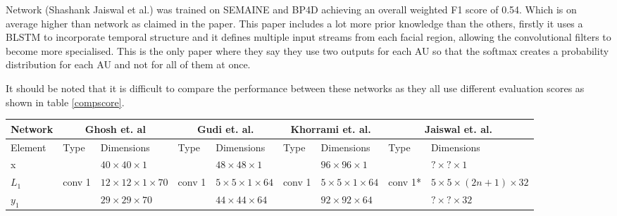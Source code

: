 Network \cite{Jaiswal2016} (Shashank Jaiswal et al.) was trained on SEMAINE and
BP4D achieving an overall weighted F1 score of 0.54. Which is on average higher
than network \cite{Gudi2015} as claimed in the paper. This paper includes a lot more
prior knowledge than the others, firstly it uses a BLSTM to incorporate temporal structure
and it defines multiple input streams from each facial region, allowing the convolutional
filters to become more specialised. This is the only paper where they say they use
two outputs for each AU so that the softmax creates a probability distribution for
each AU and not for all of them at once.

It should be noted that it is difficult to compare the performance between these
networks as they all use different evaluation scores as shown in table \ref{compscore}.
\begin{landscape}
\begin{table}[h!]
{\footnotesize
\begin{tabular}{|lllllllll|}
\hline
Network                      & \multicolumn{2}{c}{Ghosh et. al\cite{Ghosh2015}}                         & \multicolumn{2}{c}{Gudi et. al.\cite{Gudi2015}}                            & \multicolumn{2}{c}{Khorrami et. al.\cite{dodeeplearn}}                          & \multicolumn{2}{c|}{Jaiswal et. al.\cite{Jaiswal2016}}   \\ \hline
\multicolumn{1}{|l|}{Element} & Type     & \multicolumn{1}{l|}{Dimensions}                    & Type     & \multicolumn{1}{l|}{Dimensions}                      & Type          & \multicolumn{1}{l|}{Dimensions}                  & Type      & Dimensions                     \\ \hline
\multicolumn{1}{|l|}{x}       &          & \multicolumn{1}{l|}{$40\times40\times1$}           &          & \multicolumn{1}{l|}{$48\times 48\times1$}            &               & \multicolumn{1}{l|}{$96\times96\times1$}         &           & $?\times?\times1$              \\ \hline
\multicolumn{1}{|l|}{$L_1$}   & conv 1   & \multicolumn{1}{l|}{$12\times 12\times1\times 70$} & conv 1   & \multicolumn{1}{l|}{$5\times 5\times1\times64$}      & conv 1        & \multicolumn{1}{l|}{$5\times5\times1\times64$}   & conv 1*   & $5\times5\times(2n+1)\times32$ \\
\multicolumn{1}{|l|}{$y_1$}   &          & \multicolumn{1}{l|}{$29\times29\times70$}          &          & \multicolumn{1}{l|}{$44\times44\times64$}            &               & \multicolumn{1}{l|}{$92\times92\times64$}        &           & $?\times?\times32$             \\ \hline

\end{tabular}}
\end{table}
\end{landscape}

